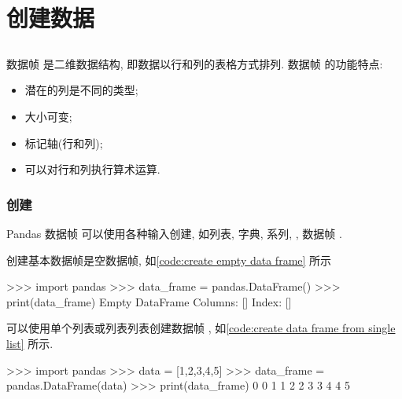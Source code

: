 \section{创建数据}
\subsection[DataFrame]{}
数据帧  是二维数据结构, 即数据以行和列的表格方式排列. 数据帧  的功能特点:%
%
\begin{itemize}
    \item 潜在的列是不同的类型;
    \item 大小可变;
    \item 标记轴(行和列);
    \item 可以对行和列执行算术运算.
\end{itemize}

\subsubsection{创建}
Pandas 数据帧  可以使用各种输入创建, 如列表, 字典, 系列, , 数据帧 .

创建基本数据帧是空数据帧, 如\cref{code:create empty data frame} 所示%
%
\begin{codebox}[
  label = code:create empty data frame,
  caption = 创建一个空的 \inlinetext{DataFrame}
]
>>> import pandas
>>> data_frame = pandas.DataFrame()
>>> print(data_frame)
Empty DataFrame
Columns: []
Index: []
\end{codebox}

可以使用单个列表或列表列表创建数据帧 , 如\cref{code:create data frame from single list} 所示.%
%
\begin{codebox}[
  label = code:create data frame from single list,
  caption = 用单个列表创建 \inlinetext{DataFrame}
]
>>> import pandas
>>> data = [1,2,3,4,5]
>>> data_frame = pandas.DataFrame(data)
>>> print(data_frame)
   0
0  1
1  2
2  3
3  4
4  5
\end{codebox}


\subsection[Panel]{}
